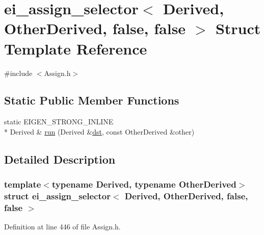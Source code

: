 \hypertarget{structei__assign__selector_3_01_derived_00_01_other_derived_00_01false_00_01false_01_4}{\section{ei\-\_\-assign\-\_\-selector$<$ Derived, Other\-Derived, false, false $>$ Struct Template Reference}
\label{structei__assign__selector_3_01_derived_00_01_other_derived_00_01false_00_01false_01_4}
}


{\ttfamily \#include $<$Assign.\-h$>$}

\subsection*{Static Public Member Functions}
\begin{DoxyCompactItemize}
\item 
static E\-I\-G\-E\-N\-\_\-\-S\-T\-R\-O\-N\-G\-\_\-\-I\-N\-L\-I\-N\-E \\*
Derived \& \hyperlink{structei__assign__selector_3_01_derived_00_01_other_derived_00_01false_00_01false_01_4_a26ef9145efd6f077de2d3879fc95b601}{run} (Derived \&\hyperlink{glext_8h_a92034251bfd455d524a9b5610cddba00}{dst}, const Other\-Derived \&other)
\end{DoxyCompactItemize}


\subsection{Detailed Description}
\subsubsection*{template$<$typename Derived, typename Other\-Derived$>$struct ei\-\_\-assign\-\_\-selector$<$ Derived, Other\-Derived, false, false $>$}



Definition at line 446 of file Assign.\-h.




